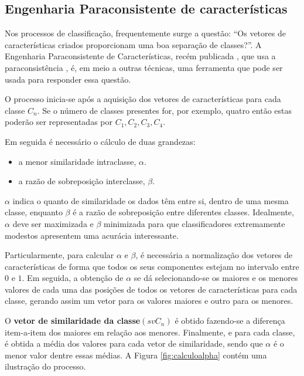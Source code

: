 			
	
		\subsection{Engenharia Paraconsistente de características}
			\par Nos processos de classificação, frequentemente surge a questão: ``Os vetores de características criados proporcionam uma boa separação de classes?''. A Engenharia Paraconsistente de Características, recém publicada \cite{8588433}, que usa a paraconsistência \cite{da1998elementos},  \cite{COSTA2000} é, em meio a outras técnicas, uma ferramenta que pode ser usada para responder essa questão.
			
			\par O processo inicia-se após a aquisição dos vetores de características para cada classe $C_n$. Se o número de classes presentes for, por exemplo, quatro então estas poderão ser representadas por $C_1, C_2, C_3, C_4$.
			\par Em seguida é necessário o cálculo de duas grandezas:
			
			\begin{itemize}
				\item a menor similaridade intraclasse, $\alpha$.
				\item a razão de sobreposição interclasse, $\beta$.
			\end{itemize}
	
			\par $\alpha$ indica o quanto de similaridade os dados têm entre si, dentro de uma mesma classe, enquanto $\beta$ é a razão de sobreposição entre diferentes classes. Idealmente, $\alpha$ deve ser maximizada e $\beta$ minimizada para que classificadores extremamente modestos apresentem uma acurácia interessante.
			
			\par Particularmente, para calcular $\alpha$ e $\beta$, é necessária a normalização dos vetores de características de forma que todos os seus componentes estejam no intervalo entre $0$ e $1$. Em seguida, a obtenção de $\alpha$ se dá selecionando-se os maiores e os menores valores de cada uma das posições de todos os vetores de características para cada classe, gerando assim um vetor para os valores maiores e outro para os menores.
			
			\par O \textbf{vetor de similaridade da classe}$(svC_n)$ é obtido fazendo-se a diferença item-a-item dos maiores em relação aos menores. Finalmente, e para cada classe, é obtida a média dos valores para cada vetor de similaridade, sendo que $\alpha$ é o menor valor dentre essas médias. A Figura \ref{fig:calculoalpha} contém uma ilustração do processo.
	
